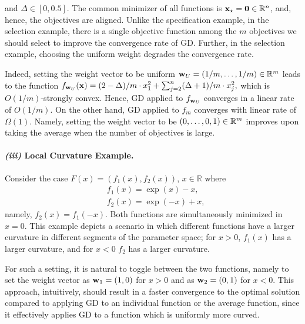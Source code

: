 and $\Delta\in [0,0.5]$. The common minimizer of all functions is ${\mathbf{x}}_\star=\bold{0} \in \mathbb{R}^n$, and, hence, the objectives are aligned. Unlike the specification example, in the selection example, there is a single objective function among the $m$ objectives we should select to improve the convergence rate of GD. Further, in the selection example, choosing the uniform weight degrades the convergence rate. 

Indeed, setting the weight vector to be uniform ${\mathbf{w}}_{U}=\left(1/m,\ldots,1/m\right)\in\mathbb{R}^m$ leads to the function
$
    f_{{\mathbf{w}}_{U}}({\mathbf{x}}) = (2-\Delta)/m \cdot x_1^2 +\sum_{j=2}^{n} (\Delta+1)/m \cdot x_j^2,
$
which is $O(1/m)$-strongly convex. Hence, GD applied to $f_{{\mathbf{w}}_{U}}$ converges in a linear rate of $O(1/m)$. On the other hand, GD applied to $f_m$ converges with linear rate of $\Omega(1)$. Namely, setting the weight vector to be $(0,\ldots,0,1)\in \mathbb{R}^m$ improves upon taking the average when the number of objectives is large.

\paragraph{\emph{(iii)} Local Curvature Example.}
Consider the case $F(x)=(f_1(x),f_2(x))$, $x\in \mathbb{R}$ where
\begin{align*}
    &f_1(x) = \exp(x)- x,\\ 
    &f_2(x) = \exp(-x) + x,
\end{align*}
namely, $f_2(x)=f_1(-x)$. Both functions are simultaneously minimized in $x=0$. This example depicts a scenario in which different functions have a larger curvature in different segments of the parameter space; for $x>0$, $f_1(x)$ has a larger curvature, and for $x<0$ $f_2$ has a larger curvature. 

For such a setting, it is natural to toggle between the two functions, namely to set the weight vector as ${\mathbf{w}}_1=(1,0)$ for $x>0$ and as ${\mathbf{w}}_2=(0,1)$ for $x<0$. This approach, intuitively, should result in a faster convergence to the optimal solution compared to applying GD to an individual function or the average function, since it effectively applies GD to a function which is uniformly more curved.

